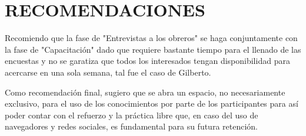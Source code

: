 \chapter{RECOMENDACIONES}
    Recomiendo que la fase de "Entrevistas a los obreros" se haga conjuntamente con la fase de "Capacitación" dado que requiere bastante tiempo para el llenado de las encuestas y no se garatiza que todos los interesados tengan disponibilidad para acercarse en una sola semana, tal fue el caso de Gilberto.
    
    Como recomendación final, sugiero que se abra un espacio, no necesariamente exclusivo, para el uso de los conocimientos por parte de los participantes para así poder contar con el refuerzo y la práctica libre que, en caso del uso de navegadores y redes sociales, es fundamental para su futura retención.
    
    \pagebreak